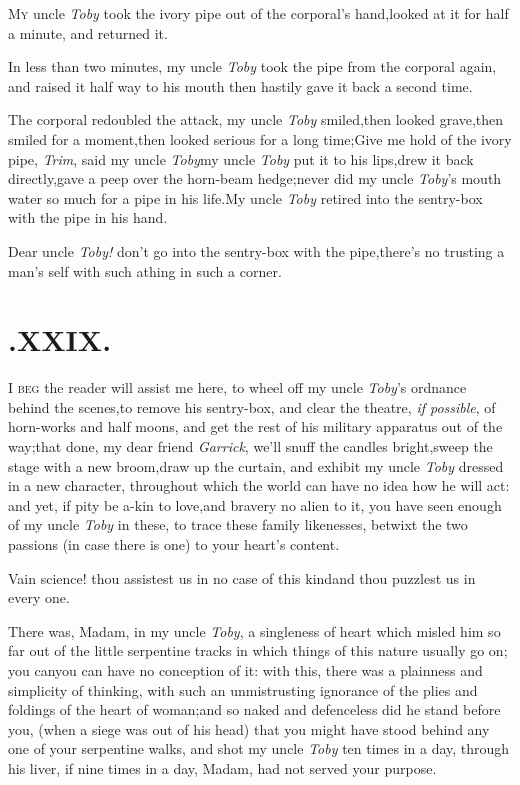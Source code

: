 \documentclass{article}
\begin{document}
\lettrine{M}{y} uncle \textit{Toby} took the ivory
pipe out of the corporal’s hand,\tsk looked at it for half
a minute, and returned it.

In less than two minutes, my uncle \textit{Toby} took the pipe
from the corporal again, and raised it half way to his
mouth\break
\tsh then hastily gave it back a second time.

The corporal redoubled the attack,\break
\tsh my uncle \textit{Toby} smiled,\tsh then looked
grave,\tsh then smiled for a moment,\tsh then
looked serious for a long time;\tsh Give me hold of the
ivory pipe, \textit{Trim}, said my uncle \textit{Toby}\tsh my
uncle \textit{Toby} put it to his lips,\tsh drew it back
directly,\tsh gave a peep over the horn-beam
hedge;\tsh never did my uncle \textit{Toby}’s mouth
water so much for a pipe in his life.\tsh My uncle
\textit{Toby} retired into the sentry-box with the pipe\break
in his hand.\tsh

\tsh Dear uncle \textit{Toby!} don’t go into the
sentry-box with the pipe,\tsk there’s no trusting a
man’s self with such a\break thing in such a corner.

\enlargethispage{2\baselineskip}
\section{.\enspace XXIX.}

\lettrine{I}{ beg} the reader will assist me here,
to wheel off my uncle \textit{Toby}’s ordnance behind the
scenes,\tsh to remove his sentry-box, and clear the
theatre, \textit{if possible}, of horn-works and half moons, and get the
rest of his military apparatus out of the way;\tsh that
done, my dear friend \textit{Garrick}, we’ll snuff the candles
bright,\tsk sweep the stage with a new broom,\tsk draw up the
curtain, and exhibit my uncle \textit{Toby} dressed in a new
character, throughout which the world can have no idea how he will
act: and yet, if pity be a-kin to love,\tsk and bravery no alien
to it, you have seen enough of my uncle \textit{Toby} in these, to
trace these family likenesses, betwixt the two passions (in case
there is one) to your heart’s content.

Vain science! thou assistest us in no case of this
kind\tsk and thou puzzlest us in every one.

There was, Madam, in my uncle \textit{Toby}, a singleness of heart
which misled him so far out of the little serpentine tracks in
which things of this nature usually go on; you can\tsk you can
have no conception of it: with this, there was a plainness and
simplicity of thinking, with such an unmistrusting ignorance of the
plies and foldings of the heart of woman;\tsh and so naked
and defenceless did he stand before you, (when a siege was out of
his head) that you might have stood behind any one of your
serpentine walks, and shot my uncle \textit{Toby} ten times in a day,
through his liver, if nine times in a day, Madam, had not served
your purpose.
\end{document}
